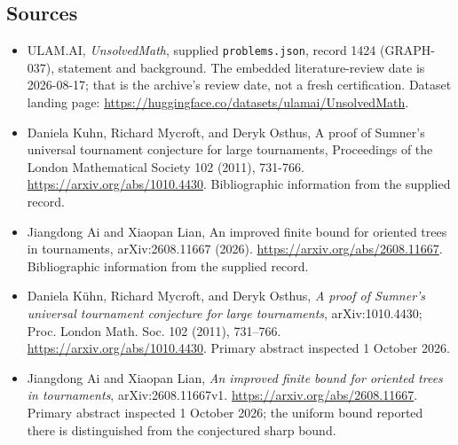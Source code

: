\documentclass[11pt,a4paper]{article}
\begin{document}
\subsection{Sources}

{\small

\begin{itemize}

\item[\hypertarget{source:1424:1}{S1}] ULAM.AI, \emph{UnsolvedMath}, supplied \texttt{problems.json}, record 1424 (GRAPH-037), statement and background. The embedded literature-review date is 2026-08-17; that is the archive’s review date, not a fresh certification. Dataset landing page: \url{https://huggingface.co/datasets/ulamai/UnsolvedMath}.

\item[\hypertarget{source:1424:2}{S2}] Daniela Kuhn, Richard Mycroft, and Deryk Osthus, A proof of Sumner's universal tournament conjecture for large tournaments, Proceedings of the London Mathematical Society 102 (2011), 731-766. \url{https://arxiv.org/abs/1010.4430}. Bibliographic information from the supplied record.

\item[\hypertarget{source:1424:3}{S3}] Jiangdong Ai and Xiaopan Lian, An improved finite bound for oriented trees in tournaments, arXiv:2608.11667 (2026). \url{https://arxiv.org/abs/2608.11667}. Bibliographic information from the supplied record.


\item[E1] Daniela K\"uhn, Richard Mycroft, and Deryk
Osthus, \emph{A proof of Sumner's universal tournament conjecture for
large tournaments}, arXiv:1010.4430; Proc. London Math. Soc. 102 (2011),
731--766. \url{https://arxiv.org/abs/1010.4430}.
Primary abstract inspected 1 October 2026.
\item[E2] Jiangdong Ai and Xiaopan Lian, \emph{An improved finite
bound for oriented trees in tournaments}, arXiv:2608.11667v1.
\url{https://arxiv.org/abs/2608.11667}. Primary abstract inspected
1 October 2026; the uniform bound reported there is distinguished from
the conjectured sharp bound.

\end{itemize}

}

\label{end:1424}
\end{document}
